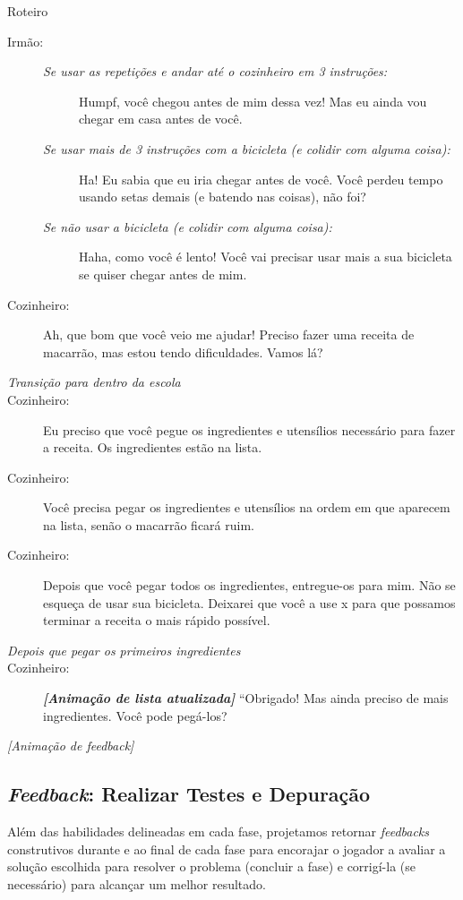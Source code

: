 \begin{description}
	\item Roteiro
    \begin{description}
    	\item[Irmão:]
        \begin{description}
        	\item[]
            \item[\textit{Se usar as repetições e andar até o cozinheiro em 3 instruções:}] Humpf, você chegou antes de mim dessa vez! Mas eu ainda vou chegar em casa antes de você.
            \item[\textit{Se usar mais de 3 instruções com a bicicleta (e colidir com alguma coisa):}] Ha! Eu sabia que eu iria chegar antes de você. Você perdeu tempo usando setas demais (e batendo nas coisas), não foi?
			\item[\textit{Se não usar a bicicleta (e colidir com alguma coisa):}] Haha, como você é lento! Você vai precisar usar mais a sua bicicleta se quiser chegar antes de mim.
        \end{description}
        \item[Cozinheiro:] Ah, que bom que você veio me ajudar! Preciso fazer uma receita de macarrão, mas estou tendo dificuldades. Vamos lá?
        \item[\textit{Transição para dentro da escola}]
		\item[Cozinheiro:] Eu preciso que você pegue os ingredientes e utensílios necessário para fazer a receita. Os ingredientes estão na lista.
		\item[Cozinheiro:] Você precisa pegar os ingredientes e utensílios na ordem em que aparecem na lista, senão o macarrão ficará ruim.
		\item[Cozinheiro:] Depois que você pegar todos os ingredientes, entregue-os para mim. Não se esqueça de usar sua bicicleta. Deixarei que você a use x para que possamos terminar a receita o mais rápido possível.
        \item[\textit{Depois que pegar os primeiros ingredientes}] \item[Cozinheiro:] \textbf{\textit{[Animação de lista atualizada]}} “Obrigado! Mas ainda preciso de mais ingredientes. Você pode pegá-los?
        \item[\textit{[Animação de feedback]}]
    \end{description}
\end{description}

\subsection{\textit{Feedback}: Realizar Testes e Depuração} \label{ssec:feedback}

Além das habilidades delineadas em cada fase, projetamos retornar \textit{feedbacks} construtivos durante e ao final de cada fase para encorajar o jogador a avaliar a solução escolhida para resolver o problema (concluir a fase) e corrigí-la (se necessário) para alcançar um melhor resultado.